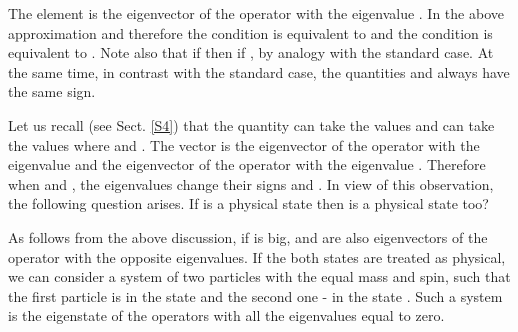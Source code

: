 \documentclass[a4paper,12pt]{article}%
\begin{document}
The element \coordHE{} is the eigenvector of the operator 
\coordHE{} with the eigenvalue \coordHE{}. 
In the above approximation \coordHE{} 
and therefore the condition \coordHE{} is equivalent to 
\coordHE{} and the condition \coordHE{} is equivalent to \coordHE{}.
Note also that if \coordHE{} then \coordHE{} if \coordHE{},
by analogy with the standard case. At the same time,
in contrast with the standard case, the quantities \coordHE{}
and \coordHE{} always have the same sign.

Let us recall (see Sect. \ref{S4}) that the quantity
\coordHE{} can take the values \coordHE{} and \coordHE{}
can take the values \coordHE{} where 
\coordHE{} and \coordHE{}. The vector \coordHE{}
is the eigenvector of the operator \coordHE{} with the
eigenvalue \coordHE{} and the eigenvector of the operator 
\coordHE{} with the eigenvalue \coordHE{}. Therefore when
\coordHE{} and \coordHE{},
the eigenvalues change their signs and 
\coordHE{}. In view of this 
observation, the following question arises. If
\coordHE{} is a physical state then is 
\coordHE{} a physical state too?

As follows from the above discussion, if \coordHE{} is big,
\coordHE{} and \coordHE{}
are also eigenvectors of the operator \coordHE{} with
the opposite eigenvalues. If the both states are
treated as physical, we can consider a system of two
particles with the equal mass and spin, such that the
first particle is in the state \coordHE{} and the
second one - in the state 
\coordHE{}. Such a system is
the eigenstate of the operators \coordHE{}
with all the eigenvalues equal to zero. 
\end{document}
